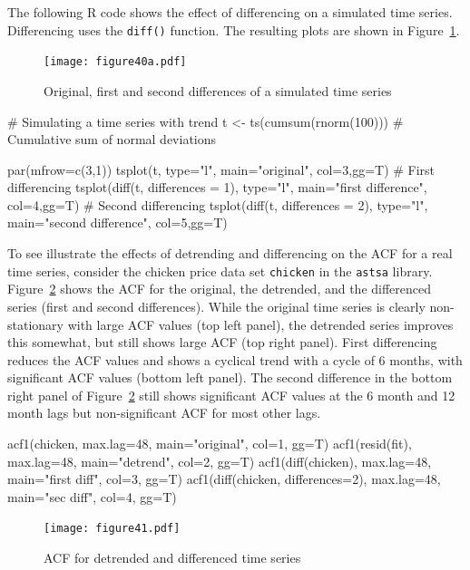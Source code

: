 The following R code shows the effect of differencing on a simulated time series. Differencing uses the \texttt{diff()} function. The resulting plots are shown in Figure~\ref{fig:figure40a}.

\begin{figure}
\centering
\texttt{[image: figure40a.pdf]}
\caption{Original, first and second differences of a simulated time series}
\label{fig:figure40a}
\end{figure}

\begin{samepage}
\begin{Rcode}
# Simulating a time series with trend
t <- ts(cumsum(rnorm(100)))  # Cumulative sum of normal deviations

par(mfrow=c(3,1))
tsplot(t, type="l", main="original", col=3,gg=T)
# First differencing
tsplot(diff(t, differences = 1), type="l", 
    main="first difference", col=4,gg=T)
# Second differencing
tsplot(diff(t, differences = 2), type="l", 
    main="second difference", col=5,gg=T)
\end{Rcode}
\end{samepage}

To see illustrate the effects of detrending and differencing on the ACF for a real time series, consider the chicken price data set \texttt{chicken} in the \texttt{astsa} library. Figure~\ref{fig:figure41} shows the ACF for the original, the detrended, and the differenced series (first and second differences). While the original time series is clearly non-stationary with large ACF values (top left panel), the detrended series improves this somewhat, but still shows large ACF (top right panel). First differencing reduces the ACF values and shows a cyclical trend with a cycle of 6 months, with significant ACF values (bottom left panel). The second difference in the bottom right panel of Figure~\ref{fig:figure41} still shows significant ACF values at the 6 month and 12 month lags but non-significant ACF for most other lags. 

\begin{Rcode}
acf1(chicken, max.lag=48, main="original", col=1, gg=T)
acf1(resid(fit), max.lag=48, main="detrend", col=2, gg=T)
acf1(diff(chicken), max.lag=48, main="first diff", col=3, gg=T)
acf1(diff(chicken, differences=2), max.lag=48, 
    main="sec diff", col=4, gg=T)
\end{Rcode}

\begin{figure}
\centering
\texttt{[image: figure41.pdf]}
\caption{ACF for detrended and differenced time series}
\label{fig:figure41}
\end{figure}


